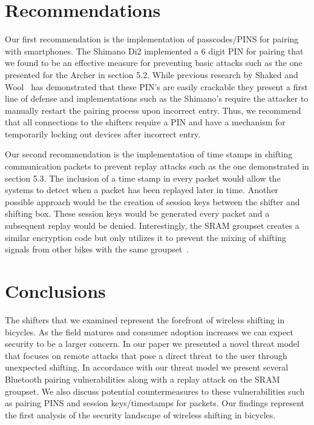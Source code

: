\documentclass[letterpaper,twocolumn,10pt]{article}
\begin{document}
\section{Recommendations}

Our first recommendation is the implementation of passcodes/PINS for pairing with smartphones. The Shimano Di2 implemented a 6 digit PIN for pairing that we found to be an effective measure for preventing basic attacks such as the one presented for the Archer in section 5.2. While previous research by Shaked and Wool~\cite{bluepin} has demonstrated that these PIN’s are easily crackable they present a first line of defense and implementations such as the Shimano’s require the attacker to manually restart the pairing process upon incorrect entry. Thus, we recommend that all connections to the shifters require a PIN and have a mechanism for temporarily locking out devices after incorrect entry.

Our second recommendation is the implementation of time stamps in shifting communication packets to prevent replay attacks such as the one demonstrated in section 5.3. The inclusion of a time stamp in every packet would allow the systems to detect when a packet has been replayed later in time. Another possible approach would be the creation of session keys between the shifter and shifting box. These session keys would be generated every packet and a subsequent replay would be denied. Interestingly, the SRAM groupset creates a similar encryption code but only utilizes it to prevent the mixing of shifting signals from other bikes with the same groupset~\cite{etapsecure}.


\section{Conclusions}

The shifters that we examined represent the forefront of wireless shifting in bicycles. As the field matures and consumer adoption increases we can expect security to be a larger concern.
In our paper we presented a novel threat model that focuses on remote attacks that pose a direct threat to the user through unexpected shifting. In accordance with our threat model we present several Bluetooth pairing vulnerabilities along with a replay attack on the SRAM groupset. We also discuss potential countermeasures to these vulnerabilities such as pairing PINS and session keys/timestamps for packets. Our findings represent the first analysis of the security landscape of wireless shifting in bicycles.
\end{document}
